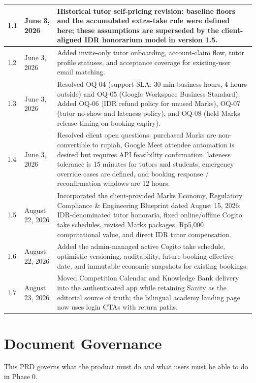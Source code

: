 \documentclass[11pt,a4paper]{article}
\begin{document}
\begin{tabular}{|p{3cm}|p{3cm}|p{8.2cm}|}
	\hline
	1.1              & June 3, 2026  & Historical tutor self-pricing revision: baseline floors and the accumulated extra-take rule were defined here; these assumptions are superseded by the client-aligned IDR honorarium model in version 1.5. \\
	\hline
	1.2              & June 3, 2026  & Added invite-only tutor onboarding, account-claim flow, tutor profile statuses, and acceptance coverage for existing-user email matching. \\
	\hline
	1.3              & June 3, 2026  & Resolved OQ-04 (support SLA: 30 min business hours, 4 hours outside) and OQ-05 (Google Workspace Business Standard). Added OQ-06 (IDR refund policy for unused Marks), OQ-07 (tutor no-show and lateness policy), and OQ-08 (held Marks release timing on booking expiry). \\
	\hline
	1.4              & June 3, 2026  & Resolved client open questions: purchased Marks are non-convertible to rupiah, Google Meet attendee automation is desired but requires API feasibility confirmation, lateness tolerance is 15 minutes for tutors and students, emergency override cases are defined, and booking response / reconfirmation windows are 12 hours. \\
	\hline
1.5              & August 22, 2026  & Incorporated the client-provided Marks Economy, Regulatory Compliance \& Engineering Blueprint dated August 15, 2026: IDR-denominated tutor honoraria, fixed online/offline Cogito take schedules, revised Marks packages, Rp5,000 computational value, and direct IDR tutor compensation. \\
\hline
1.6              & August 22, 2026  & Added the admin-managed active Cogito take schedule, optimistic versioning, auditability, future-booking effective date, and immutable economic snapshots for existing bookings. \\
\hline
1.7              & August 23, 2026  & Moved Competition Calendar and Knowledge Bank delivery into the authenticated app while retaining Sanity as the editorial source of truth; the bilingual academy landing page now uses login CTAs with return paths. \\
\hline
\end{tabular}

\section{Document Governance}

This PRD governs what the product must do and what users must be able to do in Phase 0.
\end{document}

